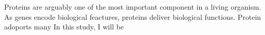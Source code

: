 Proteins are arguably one of the most important component in a living organism. As genes encode biological feactures, proteins deliver biological functions. Protein adoports many  In this study, I will be 